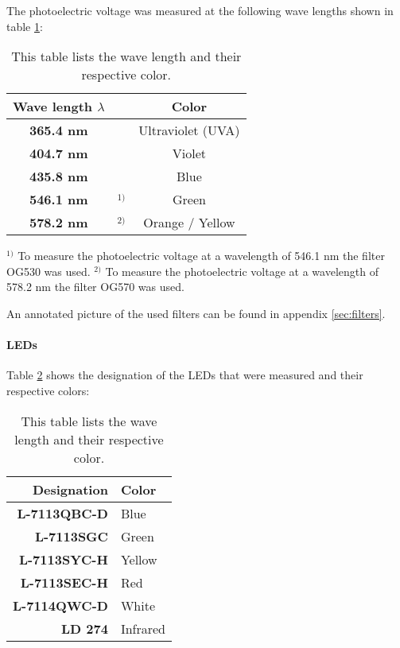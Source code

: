 The photoelectric voltage was measured at the following wave lengths shown in table \ref{tab:hg_colors}:

\begin{table}[H]
	\centering
	\renewcommand{\arraystretch}{1.2}
	\begin{tabular}{cc|c}
		\textbf{Wave length} $\lambda$ \cite{mercury-vapor_lamp} &  & \textbf{Color} \\
		\hline
		\textbf{365.4 nm} &  & Ultraviolet (UVA) \\
		\textbf{404.7 nm} &  & Violet \\
		\textbf{435.8 nm} &  & Blue \\
		\textbf{546.1 nm} & $^{1)}$ & Green \\
		\textbf{578.2 nm} & $^{2)}$ & Orange / Yellow \\ \hline
	\end{tabular}
	\caption{This table lists the wave length and their respective color.}
	\label{tab:hg_colors}
\end{table}

$^{1)}$ To measure the photoelectric voltage at a wavelength of 546.1 nm the filter OG530 was used.
$^{2)}$ To measure the photoelectric voltage at a wavelength of 578.2 nm the filter OG570 was used.

An annotated picture of the used filters can be found in appendix \ref{sec:filters}.

\paragraph{LEDs}
Table \ref{tab:leds} shows the designation of the LEDs that were measured and their respective colors:

\begin{table}[H]
	\centering
	\renewcommand{\arraystretch}{1.2}
	\begin{tabular}{r|l}
		\textbf{Designation} & \textbf{Color} \\
		\hline
		\textbf{L-7113QBC-D} & Blue \\
		\textbf{L-7113SGC} & Green \\
		\textbf{L-7113SYC-H} & Yellow \\
		\textbf{L-7113SEC-H} & Red \\
		\textbf{L-7114QWC-D} & White \\
		\textbf{LD 274} & Infrared \\ \hline
	\end{tabular}
	\caption{This table lists the wave length and their respective color.}
	\label{tab:leds}
\end{table}
